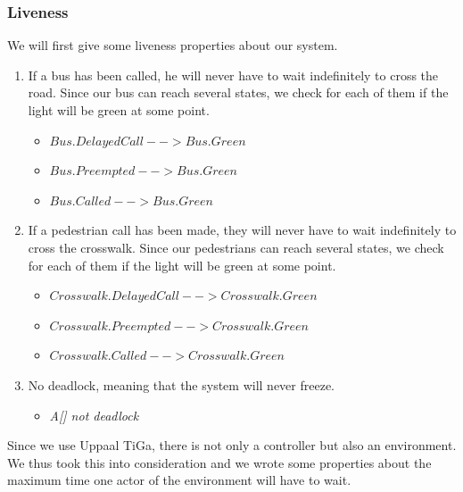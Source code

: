 \subsubsection{Liveness}
We will first give some liveness properties about our system.
\begin{enumerate}
  \item If a bus has been called, he will never have to wait indefinitely to cross the road. Since our bus can reach several states, we check for each of them if the light will be green at some point. 
  \begin{itemize}
    \item $Bus.DelayedCall --> Bus.Green$ 
    \item $Bus.Preempted --> Bus.Green$
    \item $Bus.Called --> Bus.Green$
  \end{itemize}
  \item If a pedestrian call has been made, they will never have to wait indefinitely to cross the crosswalk. Since our pedestrians can reach several states, we check for each of them if the light will be green at some point. 
  \begin{itemize}
    \item $Crosswalk.DelayedCall --> Crosswalk.Green$ 
    \item $Crosswalk.Preempted --> Crosswalk.Green$
    \item $Crosswalk.Called --> Crosswalk.Green$
  \end{itemize}
  \item No deadlock, meaning that the system will never freeze.
  \begin{itemize}
    \item \textit{A[] not deadlock}
  \end{itemize}
\end{enumerate}
Since we use Uppaal TiGa, there is not only a controller but also an environment. We thus took this into consideration and we wrote some properties about the maximum time one actor of the environment will have to wait.
